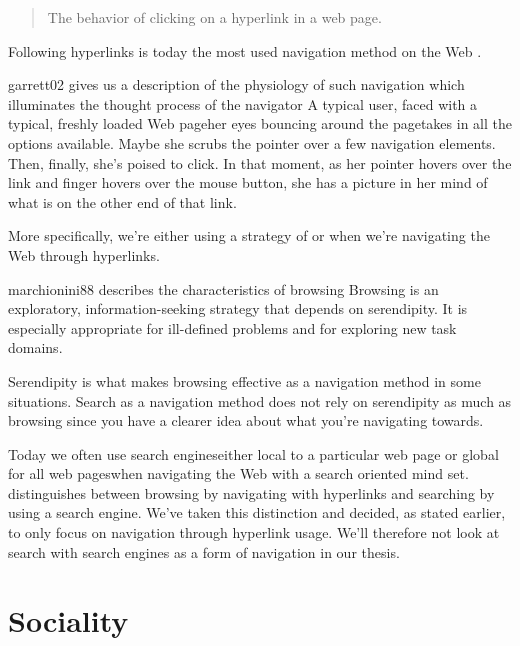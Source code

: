 \begin{quote}
  The behavior of clicking on a hyperlink in a web page.
\end{quote}

Following hyperlinks is
today the most used navigation method on the Web \citep[]{weinreich08}.
\begin{fullquote}{garrett02}{%
  gives us a description of the physiology of such navigation which
  illuminates the thought process of the navigator}
    A typical user, faced with a typical, freshly loaded Web page\dash{}her
    eyes bouncing around the page\dash{}takes in all the options available.
    Maybe she scrubs the pointer over a few navigation elements. Then,
    finally, she's poised to click. In that moment, as her pointer hovers over
    the link and finger hovers over the mouse button, she has a picture in her
    mind of what is on the other end of that link.
\end{fullquote}

More specifically, we're either using a strategy of  or
 when we're navigating the Web through hyperlinks.
\begin{fullquote}[\p{71}]{marchionini88}{%
  describes the characteristics of browsing}
    Browsing is an exploratory, information-seeking
    strategy that depends on serendipity. It is
    especially appropriate for ill-defined problems
    and for exploring new task domains.
\end{fullquote}
Serendipity\dash{}%
\dash{}is what makes browsing effective as a navigation method in some
situations.
Search as a navigation method does not rely on serendipity as much as browsing
since you have a clearer idea about what you're navigating towards.

Today we often use search engines\dash{}either local to a particular web page
or global for all web pages\dash{}when
navigating the Web with a search oriented mind set.
\citet[]{freyne07} distinguishes between browsing by navigating
with hyperlinks and searching by using a search engine. We've taken this
distinction and decided, as stated earlier, to only focus on navigation
through hyperlink usage. We'll therefore not look at search with search engines
as a form of navigation in our thesis.

\section{Sociality}

